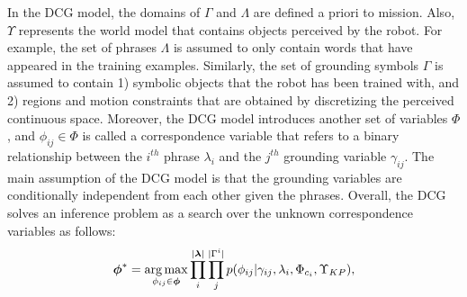 In the DCG model, the domains of $\Gamma$ and $\Lambda$ are defined a priori to mission. Also, $\Upsilon$ represents the world model that contains objects perceived by the robot. %
For example, the set of phrases $\Lambda$ is assumed to only contain words that have appeared in the training examples. Similarly, the set of grounding symbols $\Gamma$ is assumed to contain 1) symbolic objects that the robot has been trained with, and 2) regions and motion constraints that are obtained by discretizing the perceived continuous space.  Moreover, the DCG model introduces another set of variables $\Phi$, and $\phi_{ij} \in \Phi$ is called a correspondence variable that refers to a binary relationship between the $i^{th}$ phrase $\lambda_i$ and the $j^{th}$ grounding variable $\gamma_{ij}$. The main assumption of the DCG model is that the grounding variables are conditionally independent from each other given the phrases. Overall, the DCG solves an inference problem as a search over the unknown correspondence variables as follows:  
\begin{equation}
\label{eq:dcg_factored1}
\begin{split}
\boldsymbol{\phi}^* = \operatorname*{\arg\max}_{\phi_{ij} \in \boldsymbol{\phi}} \prod_{i}^{| \boldsymbol{\lambda}|} \prod_{j}^{|\Gamma^i|} p(\phi_{ij}|\gamma_{ij},\lambda_i, \Phi_{c_{i}}, \Upsilon_{KP}),
\end{split}
\end{equation}
